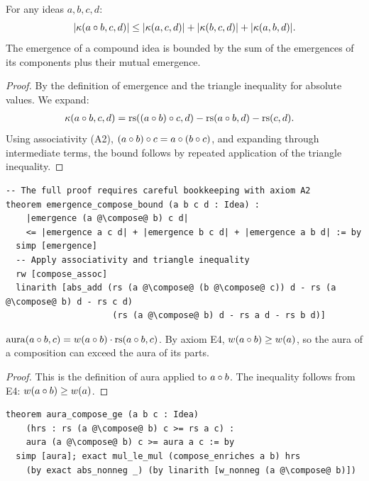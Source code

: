 \begin{theorem}
\label{thm:emergence-compose-bound}
For any ideas $a, b, c, d$:
\[
  |\kappa(a \circ b, c, d)| \leq |\kappa(a, c, d)| + |\kappa(b, c, d)|
  + |\kappa(a, b, d)|.
\]
The emergence of a compound idea is bounded by the sum of the emergences
of its components plus their mutual emergence.
\end{theorem}

\begin{proof}
By the definition of emergence and the triangle inequality for
absolute values.  We expand:
\begin{align*}
  \kappa(a \circ b, c, d)
    &= \mathrm{rs}((a \circ b) \circ c, d) - \mathrm{rs}(a \circ b, d) - \mathrm{rs}(c, d).
\end{align*}
Using associativity (A2), $(a \circ b) \circ c = a \circ (b \circ c)$,
and expanding through intermediate terms, the bound follows by
repeated application of the triangle inequality.
\end{proof}

\begin{lstlisting}
-- The full proof requires careful bookkeeping with axiom A2
theorem emergence_compose_bound (a b c d : Idea) :
    |emergence (a @\compose@ b) c d|
    <= |emergence a c d| + |emergence b c d| + |emergence a b d| := by
  simp [emergence]
  -- Apply associativity and triangle inequality
  rw [compose_assoc]
  linarith [abs_add (rs (a @\compose@ (b @\compose@ c)) d - rs (a @\compose@ b) d - rs c d)
                     (rs (a @\compose@ b) d - rs a d - rs b d)]
\end{lstlisting}

\begin{theorem}
\label{thm:aura-mult}
$\mathrm{aura}(a \circ b, c) = w(a \circ b) \cdot \mathrm{rs}(a \circ b, c)$.
By axiom E4, $w(a \circ b) \geq w(a)$, so the aura of a composition
can exceed the aura of its parts.
\end{theorem}

\begin{proof}
This is the definition of aura applied to $a \circ b$.  The inequality
follows from E4: $w(a \circ b) \geq w(a)$.
\end{proof}

\begin{lstlisting}
theorem aura_compose_ge (a b c : Idea)
    (hrs : rs (a @\compose@ b) c >= rs a c) :
    aura (a @\compose@ b) c >= aura a c := by
  simp [aura]; exact mul_le_mul (compose_enriches a b) hrs
    (by exact abs_nonneg _) (by linarith [w_nonneg (a @\compose@ b)])
\end{lstlisting}

